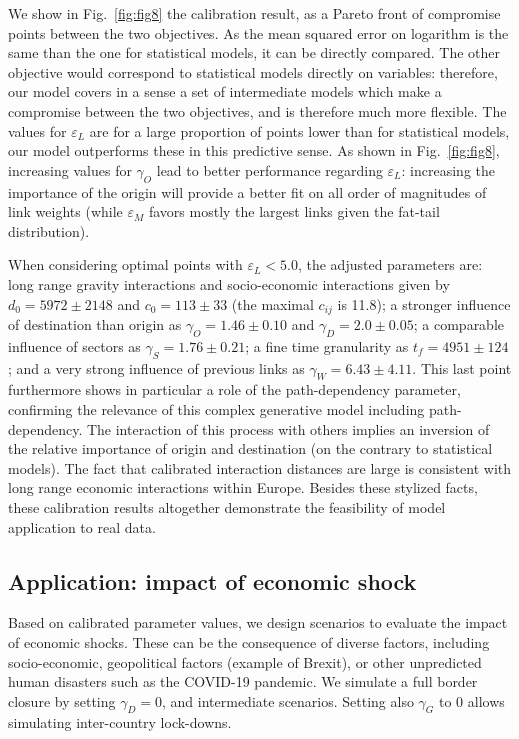 \documentclass[10pt,letterpaper]{article}
\begin{document}
We show in Fig.~\ref{fig:fig8} the calibration result, as a Pareto front of compromise points between the two objectives. As the mean squared error on logarithm is the same than the one for statistical models, it can be directly compared. The other objective would correspond to statistical models directly on variables: therefore, our model covers in a sense a set of intermediate models which make a compromise between the two objectives, and is therefore much more flexible. The values for $\varepsilon_L$ are for a large proportion of points lower than for statistical models, our model outperforms these in this predictive sense. As shown in Fig.~\ref{fig:fig8}, increasing values for $\gamma_O$ lead to better performance regarding $\varepsilon_L$: increasing the importance of the origin will provide a better fit on all order of magnitudes of link weights (while $\varepsilon_M$ favors mostly the largest links given the fat-tail distribution).

When considering optimal points with $\varepsilon_L < 5.0$, the adjusted parameters are: long range gravity interactions and socio-economic interactions given by $d_0 = 5972 \pm 2148$ and $c_0 = 113 \pm 33$ (the maximal $c_{ij}$ is 11.8); a stronger influence of destination than origin as $\gamma_O = 1.46 \pm 0.10$ and $\gamma_D = 2.0 \pm 0.05$; a comparable influence of sectors as $\gamma_S = 1.76 \pm 0.21$; a fine time granularity as $t_f = 4951 \pm 124$; and a very strong influence of previous links as $\gamma_W = 6.43 \pm 4.11$. This last point furthermore shows in particular a role of the path-dependency parameter, confirming the relevance of this complex generative model including path-dependency. The interaction of this process with others implies an inversion of the relative importance of origin and destination (on the contrary to statistical models). The fact that calibrated interaction distances are large is consistent with long range economic interactions within Europe. Besides these stylized facts, these calibration results altogether demonstrate the feasibility of model application to real data.

\subsection*{Application: impact of economic shock}

Based on calibrated parameter values, we design scenarios to evaluate the impact of economic shocks. These can be the consequence of diverse factors, including socio-economic, geopolitical factors (example of Brexit), or other  unpredicted human disasters such as the COVID-19 pandemic. We simulate a full border closure by setting $\gamma_D = 0$, and intermediate scenarios. Setting also $\gamma_G$ to 0 allows simulating inter-country lock-downs.
\end{document}
